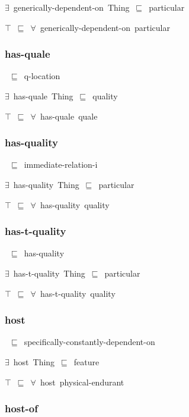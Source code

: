 \documentclass{article}
\begin{document}
\ensuremath{\exists}~generically-dependent-on~Thing~\ensuremath{\sqsubseteq}~particular

\ensuremath{\top}~\ensuremath{\sqsubseteq}~\ensuremath{\forall}~generically-dependent-on~particular

\subsubsection*{has-quale}

~\ensuremath{\sqsubseteq}~q-location

\ensuremath{\exists}~has-quale~Thing~\ensuremath{\sqsubseteq}~quality

\ensuremath{\top}~\ensuremath{\sqsubseteq}~\ensuremath{\forall}~has-quale~quale

\subsubsection*{has-quality}

~\ensuremath{\sqsubseteq}~immediate-relation-i

\ensuremath{\exists}~has-quality~Thing~\ensuremath{\sqsubseteq}~particular

\ensuremath{\top}~\ensuremath{\sqsubseteq}~\ensuremath{\forall}~has-quality~quality

\subsubsection*{has-t-quality}

~\ensuremath{\sqsubseteq}~has-quality

\ensuremath{\exists}~has-t-quality~Thing~\ensuremath{\sqsubseteq}~particular

\ensuremath{\top}~\ensuremath{\sqsubseteq}~\ensuremath{\forall}~has-t-quality~quality

\subsubsection*{host}

~\ensuremath{\sqsubseteq}~specifically-constantly-dependent-on

\ensuremath{\exists}~host~Thing~\ensuremath{\sqsubseteq}~feature

\ensuremath{\top}~\ensuremath{\sqsubseteq}~\ensuremath{\forall}~host~physical-endurant

\subsubsection*{host-of}
\end{document}
